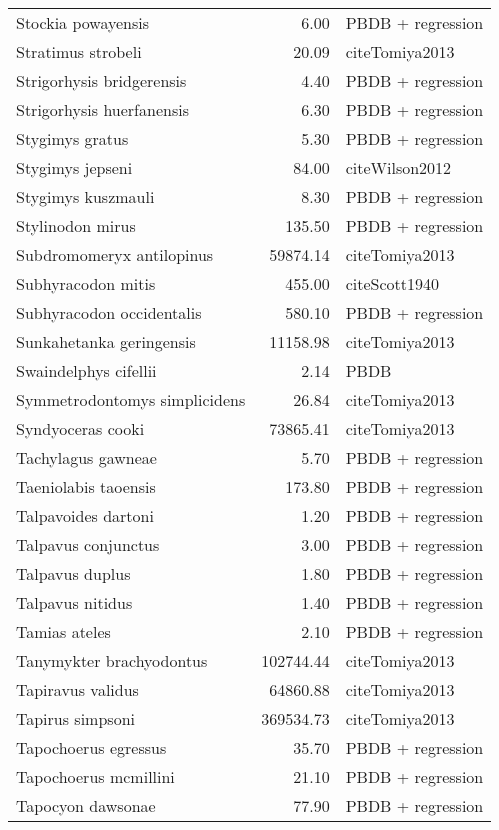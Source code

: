 \begin{table}[ht]
\begin{tabular}{lrl}
  Stockia powayensis & 6.00 & PBDB + regression \\ 
  Stratimus strobeli & 20.09 & cite{Tomiya2013} \\ 
  Strigorhysis bridgerensis & 4.40 & PBDB + regression \\ 
  Strigorhysis huerfanensis & 6.30 & PBDB + regression \\ 
  Stygimys gratus & 5.30 & PBDB + regression \\ 
  Stygimys jepseni & 84.00 & cite{Wilson2012} \\ 
  Stygimys kuszmauli & 8.30 & PBDB + regression \\ 
  Stylinodon mirus & 135.50 & PBDB + regression \\ 
  Subdromomeryx antilopinus & 59874.14 & cite{Tomiya2013} \\ 
  Subhyracodon mitis & 455.00 & cite{Scott1940} \\ 
  Subhyracodon occidentalis & 580.10 & PBDB + regression \\ 
  Sunkahetanka geringensis & 11158.98 & cite{Tomiya2013} \\ 
  Swaindelphys cifellii & 2.14 & PBDB \\ 
  Symmetrodontomys simplicidens & 26.84 & cite{Tomiya2013} \\ 
  Syndyoceras cooki & 73865.41 & cite{Tomiya2013} \\ 
  Tachylagus gawneae & 5.70 & PBDB + regression \\ 
  Taeniolabis taoensis & 173.80 & PBDB + regression \\ 
  Talpavoides dartoni & 1.20 & PBDB + regression \\ 
  Talpavus conjunctus & 3.00 & PBDB + regression \\ 
  Talpavus duplus & 1.80 & PBDB + regression \\ 
  Talpavus nitidus & 1.40 & PBDB + regression \\ 
  Tamias ateles & 2.10 & PBDB + regression \\ 
  Tanymykter brachyodontus & 102744.44 & cite{Tomiya2013} \\ 
  Tapiravus validus & 64860.88 & cite{Tomiya2013} \\ 
  Tapirus simpsoni & 369534.73 & cite{Tomiya2013} \\ 
  Tapochoerus egressus & 35.70 & PBDB + regression \\ 
  Tapochoerus mcmillini & 21.10 & PBDB + regression \\ 
  Tapocyon dawsonae & 77.90 & PBDB + regression \\ 

\end{tabular}
\end{table}
